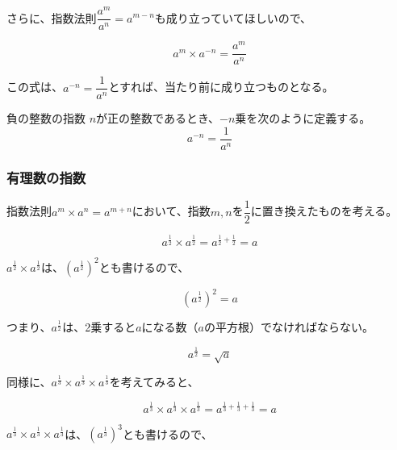 \documentclass[../math-imaging]{subfiles}
\begin{document}
さらに、指数法則$\dfrac{a^m}{a^n} = a^{m-n}$も成り立っていてほしいので、

\begin{equation}
  a^m \times a^{-n} = \dfrac{a^m}{a^n}
\end{equation}

この式は、$a^{-n}= \dfrac{1}{a^n}$とすれば、当たり前に成り立つものとなる。

\begin{definition}{負の整数の指数}
  \newline
  $n$が正の整数であるとき、$-n$乗を次のように定義する。
  \LARGE
  \begin{equation}
    a^{-n} = \dfrac{1}{a^n}
  \end{equation}
\end{definition}

\subsubsection{有理数の指数}

指数法則$a^m \times a^n = a^{m+n}$において、指数$m, n$を$\dfrac{1}{2}$に置き換えたものを考える。

\begin{equation}
  a^{\frac{1}{2}} \times a^{\frac{1}{2}} = a^{\frac{1}{2} + \frac{1}{2}} = a
\end{equation}

$a^{\frac{1}{2}} \times a^{\frac{1}{2}}$は、$(a^{\frac{1}{2}})^2$とも書けるので、

\begin{equation}
  (a^{\frac{1}{2}})^2 = a
\end{equation}

つまり、$a^{\frac{1}{2}}$は、2乗すると$a$になる数（$a$の平方根）でなければならない。

\begin{equation}
  a^{\frac{1}{2}} = \sqrt{a}
\end{equation}

同様に、$a^{\frac{1}{3}} \times a^{\frac{1}{3}} \times a^{\frac{1}{3}}$を考えてみると、

\begin{equation}
  a^{\frac{1}{3}} \times a^{\frac{1}{3}} \times a^{\frac{1}{3}} = a^{\frac{1}{3} + \frac{1}{3} + \frac{1}{3}} = a
\end{equation}

$a^{\frac{1}{3}} \times a^{\frac{1}{3}} \times a^{\frac{1}{3}}$は、$(a^{\frac{1}{3}})^3$とも書けるので、
\end{document}
